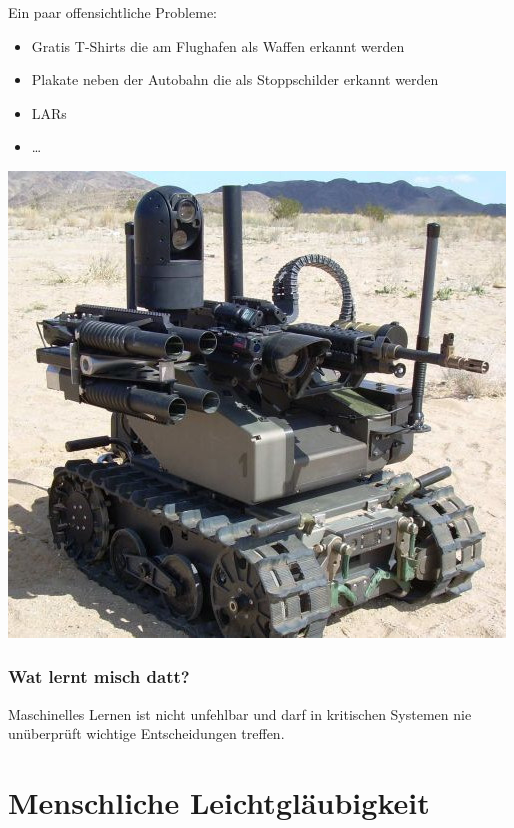\documentclass[aspectratio=43,x11names]{beamer}
\begin{document}
\begin{frame}
Ein paar offensichtliche Probleme:
\bigskip
\begin{multicols}{2}
\begin{itemize}
\item Gratis T-Shirts die am Flughafen als Waffen erkannt werden
\item Plakate neben der Autobahn die als Stoppschilder erkannt werden
\item LARs
\item \dots
\end{itemize}
\columnbreak
\includegraphics[scale=0.275]{images/lars.jpg} 
\end{multicols}
\end{frame}

\begin{frame}
\frametitle{Wat lernt misch datt?}
\begin{center}
\color{red}
\large
Maschinelles Lernen ist nicht unfehlbar und darf in kritischen Systemen nie 
unüberprüft wichtige Entscheidungen treffen.
\end{center}
\end{frame}


\section{Menschliche Leichtgläubigkeit}
\end{document}

